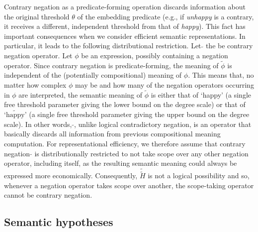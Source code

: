 \documentclass[floatsintext,doc]{apa6}
\begin{document}
Contrary negation as a predicate-forming operation discards information about the original threshold $\theta$ of the embedding predicate (e.g., if \emph{unhappy} is a contrary, it receives a different, independent threshold from that of \emph{happy}).
This fact has important consequences when we consider efficient semantic representations.
In particular, it leads to the following distributional restriction.
Let $\tilde{}$ the be contrary negation operator.
Let $\phi$ be an expression, possibly containing a negation operator. 
Since contrary negation is predicate-forming, the meaning of $\tilde{\phi}$ is independent of the (potentially compositional) meaning of $\phi$.
This means that, no matter how complex $\phi$ may be and how many of the negation operators occurring in $\phi$ are interpreted, the semantic meaning of $\tilde{\phi}$ is either that of `happy' (a single free threshold parameter giving the lower bound on the degree scale) or that of $\tilde{\textrm{`happy'}}$ (a single free threshold parameter giving the upper bound on the degree scale).
In other words, $\tilde{}$, unlike logical contradictory negation, is an operator that basically discards all information from previous compositional meaning computation.
For representational efficiency, we therefore assume that contrary negation $\tilde{}$ is distributionally restricted to not take scope over any other negation operator, including itself, as the resulting semantic meaning could always be expressed more economically. 
Consequently, $\tilde{\tilde{H}}$ is not a logical possibility \cite{Horn1989:Natural} and so, whenever a negation operator takes scope over another, the scope-taking operator cannot be contrary negation.



\subsection{Semantic hypotheses}
\end{document}
